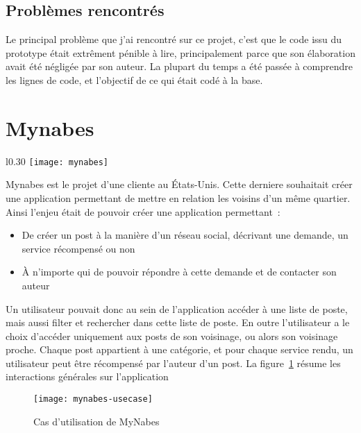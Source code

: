 \documentclass[rapport.tex]{subfiles}
\begin{document}
        \subsection{Problèmes rencontrés}
        Le principal problème que j'ai rencontré sur ce projet, c'est que le code issu du prototype était extrêment pénible à lire, principalement 
        parce que son élaboration avait été négligée par son auteur. La plupart du temps a été passée à comprendre les lignes de
        code, et l'objectif de ce qui était codé à la base.

        \section{Mynabes}\label{subsec:mynabes}

        \begin{wrapfigure}{l}{0.30\textwidth}
            \centering
            \texttt{[image: mynabes]}
        \end{wrapfigure}

        Mynabes est le projet d'une cliente au États-Unis.
        Cette derniere souhaitait créer une application 
        permettant de mettre en relation les voisins d'un
        même quartier.
        Ainsi l'enjeu était de pouvoir créer une application permettant~:
        \begin{itemize}
            \item De créer un post à la manière d'un réseau social, décrivant une demande, un service récompensé ou non
            \item À n'importe qui de pouvoir répondre à 
                cette demande et de contacter son auteur
        \end{itemize}

        Un utilisateur pouvait donc au sein de l'application accéder à une liste de poste, 
        mais aussi filter et rechercher dans cette liste de poste. En outre l'utilisateur
        a le choix d'accéder uniquement aux posts de son voisinage, ou alors son voisinage proche.
        Chaque post appartient à une catégorie, et pour chaque service rendu, un utilisateur peut être récompensé
        par l'auteur d'un post. La figure~\ref{fig:mynabes-usecase} résume les interactions générales sur l'application

        \begin{figure}
            \centering
            \texttt{[image: mynabes-usecase]}
            \caption{Cas d'utilisation de MyNabes}\label{fig:mynabes-usecase}
        \end{figure}
\end{document}
